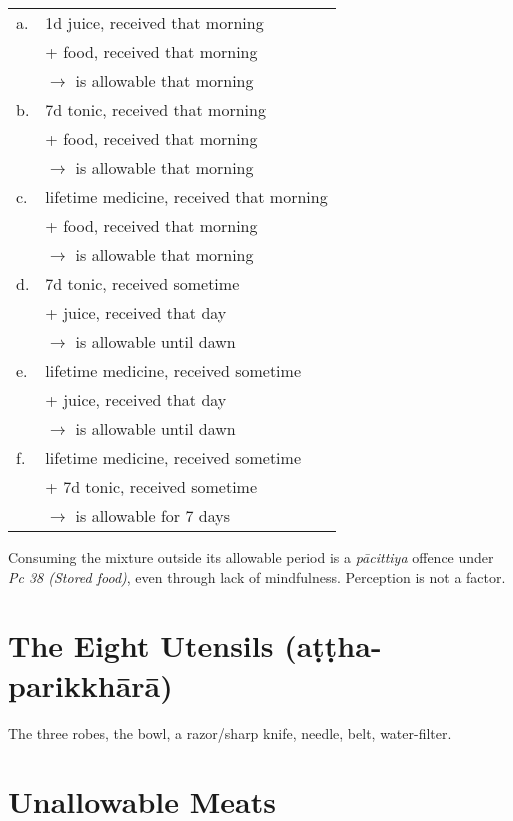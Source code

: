 \begin{tabular}{@{}ll@{}}
  a. & 1d juice, received that morning \\
     &  + food, received that morning \\
     & \(\rightarrow\) is allowable that morning \\
  \hline
  b. & 7d tonic, received that morning \\
     & + food, received that morning \\
     & \(\rightarrow\) is allowable that morning \\
  \hline
  c. & lifetime medicine, received that morning \\
     & + food, received that morning \\
     & \(\rightarrow\) is allowable that morning \\
  \hline
  d. & 7d tonic, received sometime \\
     & + juice, received that day \\
     & \(\rightarrow\) is allowable until dawn \\
  \hline
  e. & lifetime medicine, received sometime \\
     & + juice, received that day \\
     & \(\rightarrow\) is allowable until dawn \\
  \hline
  f. & lifetime medicine, received sometime \\
     & + 7d tonic, received sometime \\
     & \(\rightarrow\) is allowable for 7 days \\
\end{tabular}

Consuming the mixture outside its allowable period is a \emph{pācittiya} offence
under \emph{Pc 38 (Stored food)}, even through lack of mindfulness. Perception
is not a factor.


\ifhandbookedition
\clearpage
\fi

\section*{The Eight Utensils (aṭṭha-parikkhārā)}

The three robes, the bowl, a razor/sharp knife, needle, belt, water-filter.\\
\mbox{}

\section*{Unallowable Meats}

